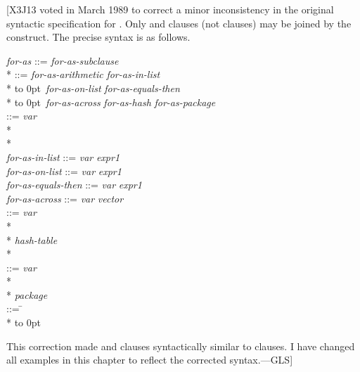 [X3J13 voted in March 1989  to correct a minor
inconsistency in the original syntactic specification for .  Only 
and  clauses (not  clauses) may be joined by the  construct. The
precise syntax is as follows.
\begin{tabbing}
{\it for-as\/} ::=  {\it for-as-subclause\/}  \\*
 ::= \={\it for-as-arithmetic\/} {\Mor} {\it for-as-in-list\/} \\*
\>\hbox to 0pt{\hss\Mor~}{\it for-as-on-list\/} {\Mor} {\it for-as-equals-then\/}  \\*
\>\hbox to 0pt{\hss\Mor~}{\it for-as-across\/} {\Mor} {\it for-as-hash\/} {\Mor} {\it for-as-package\/} \poptabs \\
 ::= \={\it var\/}   \\*
\> \\*
\> \poptabs \\
{\it for-as-in-list\/} ::= {\it var\/}   {\it expr1\/}  \\
{\it for-as-on-list\/} ::= {\it var\/}   {\it expr1\/}  \\
{\it for-as-equals-then\/} ::= {\it var\/}  \cdf{=} {\it expr1\/}  \\
{\it for-as-across\/} ::= {\it var\/}   {\it vector\/} \\
 ::= \={\it var\/}    \\*
\> \\*
\> {\it hash-table\/} \\*
\> \poptabs \\
 ::= \={\it var\/}    \\*
 \\*
\> {\it package\/} \poptabs \\
 ::= \= {\Mor}  {\Mor}  \\*
\>\hbox to 0pt{\hss\Mor~} {\Mor}  {\Mor}  \poptabs
\end{tabbing}
This correction made  and  clauses syntactically
similar to  clauses.  I have changed all examples in this
chapter to reflect the corrected syntax.---GLS]

